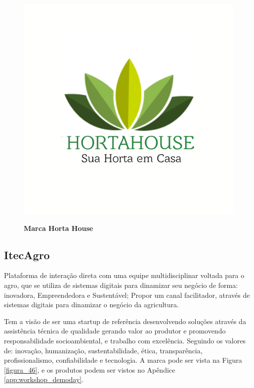 \begin{figure}[H]
\centering
\caption{\textbf{Marca Horta House}}
\includegraphics[scale=0.1]{Imagens/hortahouse.png}
\label{figura_25}
\end{figure}

\subsection{ItecAgro}

Plataforma de interação direta com uma equipe multidisciplinar voltada para o agro, que se utiliza de sistemas digitais para dinamizar seu negócio de forma: inovadora, Empreendedora e Sustentável; Propor um canal facilitador, através de sistemas digitais para dinamizar o negócio da agricultura.

Tem a visão de ser uma startup de referência desenvolvendo soluções através da assistência técnica de qualidade gerando valor ao produtor e promovendo responsabilidade socioambiental, e trabalho com excelência.
Seguindo os valores de: inovação, humanização, sustentabilidade, ética, transparência, profissionalismo, confiabilidade e tecnologia. A marca pode ser vista na Figura \ref{figura_46}, e os produtos podem ser vistos no Apêndice \ref{app:workshop_demoday}.

